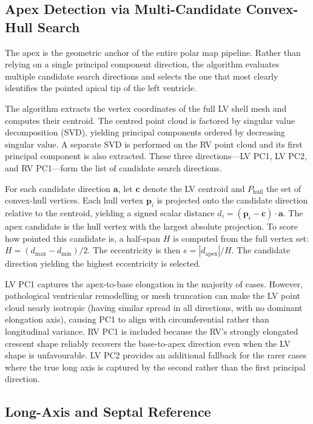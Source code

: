 \subsection{Apex Detection via Multi-Candidate Convex-Hull Search}

The apex is the geometric anchor of the entire polar map pipeline. Rather than relying on a
single principal component direction, the algorithm evaluates multiple candidate search
directions and selects the one that most clearly identifies the pointed apical tip of the left
ventricle.

The algorithm extracts the vertex coordinates of the full LV shell mesh and computes their
centroid. The centred point cloud is factored by singular value decomposition (SVD), yielding
principal components ordered by decreasing singular value. A separate SVD is performed
on the RV point cloud and its first principal component is also extracted. These three
directions---LV PC1, LV PC2, and RV PC1---form the list of candidate search directions.

For each candidate direction $\mathbf{a}$, let $\mathbf{c}$ denote the LV centroid and
$P_\text{hull}$ the set of convex-hull vertices. Each hull vertex $\mathbf{p}_i$ is projected
onto the candidate direction relative to the centroid, yielding a signed scalar distance
$d_i = (\mathbf{p}_i - \mathbf{c}) \cdot \mathbf{a}$. The apex candidate is the hull vertex
with the largest absolute projection. To score how pointed this candidate is, a half-span $H$
is computed from the full vertex set: $H = (d_\text{max} - d_\text{min}) / 2$. The
eccentricity is then $e = |d_\text{apex}| / H$. The candidate direction yielding the highest
eccentricity is selected.

LV PC1 captures the apex-to-base elongation in the majority of cases. However, pathological
ventricular remodelling or mesh truncation can make the LV point cloud nearly isotropic
(having similar spread in all directions, with no dominant elongation axis), causing PC1 to
align with circumferential rather than longitudinal variance. RV PC1 is
included because the RV's strongly elongated crescent shape reliably recovers the
base-to-apex direction even when the LV shape is unfavourable. LV PC2 provides an
additional fallback for the rarer cases where the true long axis is captured by the second
rather than the first principal direction.

\subsection{Long-Axis and Septal Reference}

